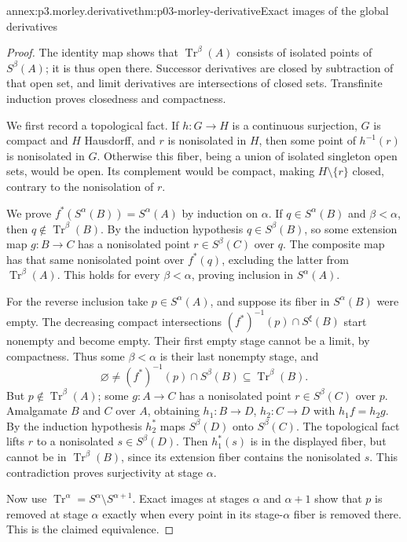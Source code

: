 \begin{annexitem}{annex:p3.morley.derivative}{thm:p03-morley-derivative}{Exact images of the global derivatives}
\begin{proof}
The identity map shows that \(\operatorname{Tr}^\beta(A)\)
consists of isolated points of \(S^\beta(A)\); it is thus open
there. Successor derivatives are closed by subtraction of that
open set, and limit derivatives are intersections of closed sets.
Transfinite induction proves closedness and compactness.

We first record a topological fact. If \(h:G\to H\) is a
continuous surjection, \(G\) is compact and \(H\) Hausdorff,
and \(r\) is nonisolated in \(H\), then some point of
\(h^{-1}(r)\) is nonisolated in \(G\). Otherwise this fiber,
being a union of isolated singleton open sets, would be open.
Its complement would be compact, making \(H\setminus\{r\}\)
closed, contrary to the nonisolation of \(r\).

We prove \(f^*(S^\alpha(B))=S^\alpha(A)\) by induction on
\(\alpha\). If \(q\in S^\alpha(B)\) and \(\beta<\alpha\),
then \(q\notin\operatorname{Tr}^\beta(B)\). By the induction
hypothesis \(q\in S^\beta(B)\), so some extension map
\(g:B\to C\) has a nonisolated point \(r\in S^\beta(C)\)
over \(q\). The composite map has that same nonisolated point
over \(f^*(q)\), excluding the latter from
\(\operatorname{Tr}^\beta(A)\). This holds for every
\(\beta<\alpha\), proving inclusion in \(S^\alpha(A)\).

For the reverse inclusion take \(p\in S^\alpha(A)\), and
suppose its fiber in \(S^\alpha(B)\) were empty. The decreasing
compact intersections
\((f^*)^{-1}(p)\cap S^\xi(B)\) start nonempty and become empty.
Their first empty stage cannot be a limit, by compactness.
Thus some \(\beta<\alpha\) is their last nonempty stage, and
\[
 \varnothing\ne(f^*)^{-1}(p)\cap S^\beta(B)
                  \subseteq\operatorname{Tr}^\beta(B).
\]
But \(p\notin\operatorname{Tr}^\beta(A)\); some
\(g:A\to C\) has a nonisolated point \(r\in S^\beta(C)\)
over \(p\). Amalgamate \(B\) and \(C\) over \(A\), obtaining
\(h_1:B\to D\), \(h_2:C\to D\) with \(h_1f=h_2g\).
By the induction hypothesis \(h_2^*\) maps
\(S^\beta(D)\) onto \(S^\beta(C)\). The topological fact
lifts \(r\) to a nonisolated \(s\in S^\beta(D)\).
Then \(h_1^*(s)\) is in the displayed fiber, but cannot be in
\(\operatorname{Tr}^\beta(B)\), since its extension fiber
contains the nonisolated \(s\). This contradiction proves
surjectivity at stage \(\alpha\).

Now use \(\operatorname{Tr}^\alpha=S^\alpha\setminus
S^{\alpha+1}\). Exact images at stages \(\alpha\) and
\(\alpha+1\) show that \(p\) is removed at stage \(\alpha\)
exactly when every point in its stage-\(\alpha\) fiber is
removed there. This is the claimed equivalence.


\end{proof}
\end{annexitem}
